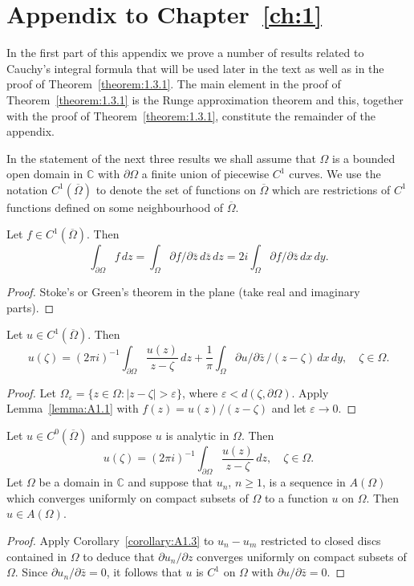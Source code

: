 \section*{Appendix to Chapter~\ref{ch:1}}\label{app:1}
In the first part of this appendix we prove a number of results related to Cauchy's integral formula that will be used later in the text as well as in the proof of Theorem~\ref{theorem:1.3.1}. The main element in the proof of Theorem~\ref{theorem:1.3.1} is the Runge approximation theorem and this, together with the proof of Theorem~\ref{theorem:1.3.1}, constitute the remainder of the appendix.

In the statement of the next three results we shall assume that $\Omega$ is a bounded open domain in $\mathbb C$ with $\partial\Omega$ a finite union of piecewise $C^1$ curves. We use the notation $C^1(\overline\Omega)$ to denote the set of functions on $\overline\Omega$ which are restrictions of $C^1$ functions defined on some neighbourhood of $\overline\Omega$.

 Let $f\in C^1(\overline\Omega)$. Then
\[ \int_{\partial\Omega}f\,dz=\int_\Omega\partial f/\partial\bar z\,d\bar z\,dz=2i\int_\Omega\partial f/\partial\bar z\,dx\,dy. \]
\begin{proof} Stoke's or Green's theorem in the plane (take real and imaginary parts). \end{proof}

 Let $u\in C^1(\overline\Omega)$. Then
\[ u(\zeta)=(2\pi i)^{-1}\int_{\partial\Omega}\frac{u(z)}{z-\zeta}\,dz+\frac1\pi\int_\Omega\partial u/\partial\bar z\,/(z-\zeta)\,dx\,dy,\quad\zeta\in\Omega. \]
\begin{proof} Let $\Omega_\varepsilon=\{z\in\Omega:|z-\zeta|>\varepsilon\}$, where $\varepsilon<d(\zeta,\partial\Omega)$. Apply Lemma~\ref{lemma:A1.1} with $f(z)=u(z)/(z-\zeta)$ and let $\varepsilon\to0$. \end{proof}

 Let $u\in C^0(\overline\Omega)$ and suppose $u$ is analytic in $\Omega$. Then
\[ u(\zeta)=(2\pi i)^{-1}\int_{\partial\Omega}\frac{u(z)}{z-\zeta}\,dz,\quad\zeta\in\Omega. \]
 Let $\Omega$ be a domain in $\mathbb C$ and suppose that $u_n$, $n\geq1$, is a sequence in $A(\Omega)$ which converges uniformly on compact subsets of $\Omega$ to a function $u$ on $\Omega$. Then $u\in A(\Omega)$.
\begin{proof} Apply Corollary~\ref{corollary:A1.3} to $u_n-u_m$ restricted to closed discs contained in $\Omega$ to deduce that $\partial u_n/\partial z$ converges uniformly on compact subsets of $\Omega$. Since $\partial u_n/\partial\bar z=0$, it follows that $u$ is $C^1$ on $\Omega$ with $\partial u/\partial\bar z=0$. \end{proof}

